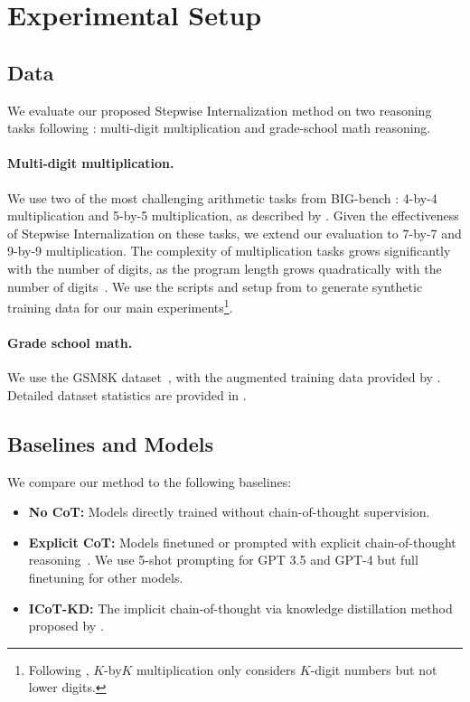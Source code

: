 \documentclass{article}
\newcommand{\icotkd}{{ICoT-KD}}
\begin{document}
\section{\label{sec:experiments}Experimental Setup}
\subsection{Data}
We evaluate our proposed Stepwise Internalization method on two reasoning tasks following \citet{deng2023implicit}: multi-digit multiplication and grade-school math reasoning.

\paragraph{Multi-digit multiplication.} We use two of the most challenging arithmetic tasks from BIG-bench \citep{srivastava2023beyond}: 4-by-4 multiplication and 5-by-5 multiplication, as described by \citet{deng2023implicit}. Given the effectiveness of Stepwise Internalization on these tasks, we extend our evaluation to 7-by-7 and 9-by-9 multiplication. The complexity of multiplication tasks grows significantly with the number of digits, as the program length grows quadratically with the number of digits~\citep{dziri2024faith}. We use the scripts and setup from \citet{deng2023implicit} to generate synthetic training data for our main experiments\footnote{Following \citet{deng2023implicit}, $K$-by$K$ multiplication only considers $K$-digit numbers but not lower digits.}.

\paragraph{Grade school math.} We use the GSM8K dataset~\citep{cobbe2021training}, with the augmented training data provided by \citet{deng2023implicit}. Detailed dataset statistics are provided in .

\subsection{Baselines and Models}
We compare our method to the following baselines:
\begin{itemize}
    \item \textbf{No CoT:} Models directly trained without chain-of-thought supervision.
    \item \textbf{Explicit CoT:} Models finetuned or prompted with explicit chain-of-thought reasoning~\citep{nye2021work}. We use 5-shot prompting for GPT 3.5 and GPT-4 but full finetuning for other models.
    \item \textbf{\icotkd:} The implicit chain-of-thought via knowledge distillation method proposed by \citet{deng2023implicit}.
\end{itemize}
\end{document}
